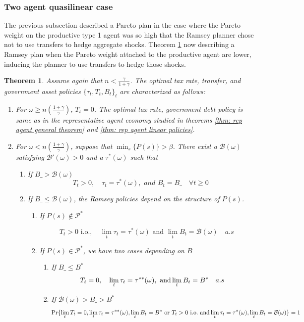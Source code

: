 \documentclass[thmsb,11pt]{article}
\newtheorem{theorem}{Theorem}
\begin{document}

\subsubsection{Two agent quasilinear case}

The previous subsection described a Pareto plan in  the case where the Pareto weight on the productive type 1 agent
was so high that the Ramsey planner chose not to use  transfers to hedge aggregate shocks. 
Theorem \ref{thm heterogeneous agents} now  describing a Ramsey plan when  the Pareto weight attached to  the productive agent are lower,
inducing the planner to use transfers to hedge those shocks. 
 
 
\begin{theorem}
\label{thm heterogeneous agents}
  Assume again that $n<\frac{\gamma}{1+\gamma}$.
The optimal tax rate, transfer, and government asset policies $\{\tau_t,T_t,B_t\}_t$ are characterized as follows:


\begin{enumerate}
 \item For $\omega\geq n \left(\frac{1+\gamma}{\gamma}\right)$,  $T_t=0$.  The optimal tax rate, government debt policy is same as in the representative agent economy studied in
 theorems \ref{thm: rep agent general theorem} and \ref{thm: rep agent linear policies}.
 \item For $\omega< n \left(\frac{1+\gamma}{\gamma}\right)$, suppose that $\min_{s}\{P(s)\}>\beta$. There exist  a $\mathcal{B}(\omega)$  satisfying $\mathcal{B}'(\omega)>0$ and a $\tau^*(\omega)$ such that
 \begin{enumerate}
  \item If $B\_>\mathcal{B(\omega)}$
\[T_t>0, \quad \tau_t=\tau^*(\omega), \textit{ and } B_t=B\_ \quad \forall t \geq 0 \]
\item If $B\_\leq \mathcal{B(\omega)}$, the Ramsey policies depend on the structure of $P(s)$.
\begin{enumerate}
 \item If $P(s)\not \in \mathcal{P}^*$

   \[ T_t>0 \text{ i.o.},\quad \lim_t\tau_t=\tau^*(\omega) \text{ and } \lim_tB_t=\mathcal{B}(\omega)\quad \textit{a.s}\]

 \item If $P(s)\in \mathcal{P}^*$, we have two cases depending on $B\_$
\begin{enumerate}
 \item If $B\_\leq B^*$
 \[T_t = 0, \quad \lim_t \tau_t=\tau^{**} (\omega), \ {\rm  and } \lim_tB_t=  B^*\quad a.s \]
\item If $\mathcal{B}(\omega)>B\_>B^*$
\small
\[\Pr\{\lim_t T_t = 0, \lim_t \tau_t=\tau^{**}(\omega),\lim_tB_t=  B^* \textrm{ or }  T_t>0 \text{ i.o.} \ {\rm and } \lim_t\tau_t=\tau^*(\omega), \lim_tB_t=\mathcal{B}(\omega) \}=1 \]
 \normalsize
\end{enumerate}


\end{enumerate}
\end{enumerate}
\end{enumerate}
\end{theorem}
\end{document}
